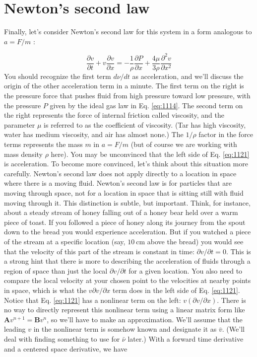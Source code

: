 \section*{Newton\rq s second law}
Finally, let\rq s consider Newton\rq s second law for this system in a form analogous to $a=F / m$ :

\begin{equation}\label{eq:1121}
\frac{\partial v}{\partial t}+v \frac{\partial v}{\partial x}=-\frac{1}{\rho} \frac{\partial P}{\partial x}+\frac{4 \mu}{3 \rho} \frac{\partial^{2} v}{\partial x^{2}}
\end{equation}
You should recognize the first term $d \nu / d t$ as acceleration, and we\rq ll discuss the origin of the other acceleration term in a minute. The first term on the right is the pressure force that pushes fluid from high pressure toward low pressure, with the pressure $P$ given by the ideal gas law in Eq. \eqref{eq:1114}. The second term on the right represents the force of internal friction called viscosity, and the parameter $\mu$ is referred to as the coefficient of viscosity. (Tar has high viscosity, water has medium viscosity, and air has almost none.) The $1 / \rho$ factor in the force terms represents the mass $m$ in $a=F / m$ (but of course we are working with mass density $\rho$ here).
You may be unconvinced that the left side of Eq. \eqref{eq:1121} is acceleration. To become more convinced, let\rq s think about this situation more carefully. Newton\rq s second law does not apply directly to a location in space where there is a moving fluid. Newton\rq s second law is for particles that are moving through space, not for a location in space that is sitting still with fluid moving through it. This distinction is subtle, but important. Think, for instance, about a steady stream of honey falling out of a honey bear held over a warm piece of toast. If you followed a piece of honey along its journey from the spout down to the bread you would experience acceleration. But if you watched a piece of the stream at a specific location (say, $10 \mathrm{~cm}$ above the bread) you would see that the velocity of this part of the stream is constant in time: $\partial v / \partial t=0$. This is a strong hint that there is more to describing the acceleration of fluids through a region of space than just the local $\partial v / \partial t$ for a given location. You also need to compare the local velocity at your chosen point to the velocities at nearby points in space, which is what the $v \partial v / \partial x$ term does in the left side of Eq. \eqref{eq:1121}.
Notice that Eq. \eqref{eq:1121} has a nonlinear term on the left: $v(\partial v / \partial x)$. There is no way to directly represent this nonlinear term using a linear matrix form like $\mathbf{A} v^{n+1}=\mathbf{B} v^{n}$, so we'll have to make an approximation. We\rq ll assume that the leading $v$ in the nonlinear term is somehow known and designate it as $\bar{v}$. (We\rq ll deal with finding something to use for $\bar{\nu}$ later.) With a forward time derivative and a centered space derivative, we have


